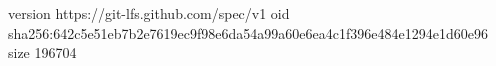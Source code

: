 version https://git-lfs.github.com/spec/v1
oid sha256:642c5e51eb7b2e7619ec9f98e6da54a99a60e6ea4c1f396e484e1294e1d60e96
size 196704
